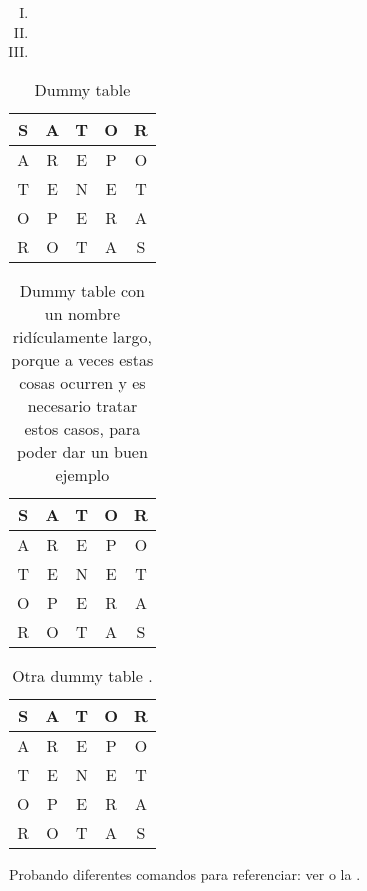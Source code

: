 \lipsum[19-22]
\begin{enumerate}[(I)]
\item \lipsum[4][1]
\item \lipsum[4][2]
\item \lipsum[4][3]
\end{enumerate}

\begin{table}[htbp]
	\centering
	\begin{tabular}{|c|c|c|c|c|} \hline
        S & A & T & O & R\\ \hline
        A & R & E & P & O\\ \hline
        T & E & N & E & T\\ \hline
        O & P & E & R & A\\ \hline
        R & O & T & A & S\\ \hline
    \end{tabular}
    
    \caption{Dummy table}
    \label{tab:dummytable1}
\end{table}

\lipsum[23-26]

\begin{table}[hbtp]
	\centering
	\begin{tabular}{|c|c|c|c|c|} \hline
        S & A & T & O & R\\ \hline
        A & R & E & P & O\\ \hline
        T & E & N & E & T\\ \hline
        O & P & E & R & A\\ \hline
        R & O & T & A & S\\ \hline
    \end{tabular}
    
    \caption[Dummy table de nombre largo]{Dummy table con un nombre ridículamente largo, porque a veces estas cosas ocurren y es necesario tratar estos casos, para poder dar un buen ejemplo}
    \label{tab:dummytable2}
\end{table}

\begin{table}[htbp]
	\centering
	\begin{tabular}{|c|c|c|c|c|} \hline
        S & A & T & O & R\\ \hline
        A & R & E & P & O\\ \hline
        T & E & N & E & T\\ \hline
        O & P & E & R & A\\ \hline
        R & O & T & A & S\\ \hline
    \end{tabular}
    
    \caption[Nombre corto]{Otra dummy table \parencite{cabrera2015evolucion}.}
    \label{tab:dummytable3}
\end{table}

\lipsum[27-30]

Probando diferentes comandos para referenciar: ver  o la  .